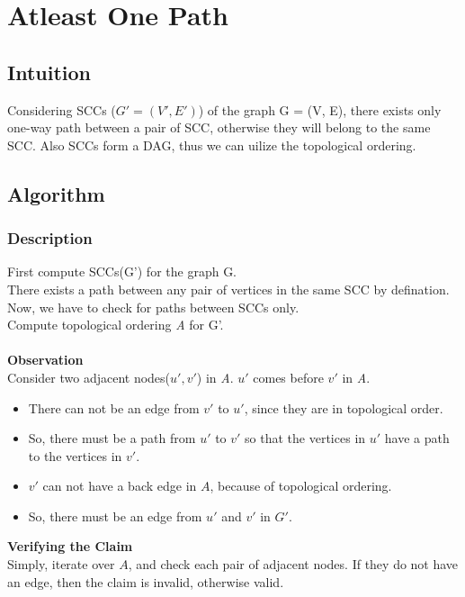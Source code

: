 \documentclass{article}
\begin{document}
\section{Atleast One Path}
\subsection{Intuition}
Considering SCCs ($G' = (V',E')$) of the graph G = (V, E), there exists only one-way path between a pair of SCC, otherwise they will belong to the same SCC. Also SCCs form a DAG, thus we can uilize the topological ordering.

\subsection{Algorithm}
\subsubsection{Description}
First compute SCCs(G') for the graph G. \\ There exists a path between any pair of vertices in the same SCC by defination.\\ 
Now, we have to check for paths between SCCs only.\\ Compute topological ordering \emph{A} for G'. \\ \\
\textbf{Observation} \\ 
Consider two adjacent nodes($u',v'$) in \emph{A}. $u'$ comes before $v'$ in \emph{A}.
\begin{itemize}
\item There can not be an edge from $v'$ to $u'$, since they are in topological order.
\item So, there must be a path from $u'$ to $v'$ so that the vertices in $u'$ have a path to the vertices in $v'$.
\item $v'$ can not have a back edge in $A$, because of topological ordering.
\item So, there must be an edge from $u'$ and $v'$ in $G'$.
\end{itemize}
\textbf{Verifying the Claim} \\
Simply, iterate over $A$, and check each pair of adjacent nodes. If they do not have an edge, then the claim is invalid, otherwise valid.\newpage
\end{document}
